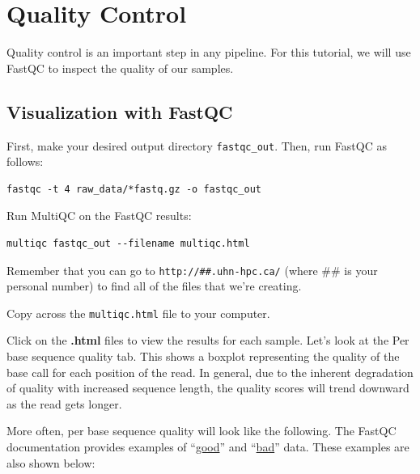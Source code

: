 \documentclass[
]{book}
\begin{document}
\section{Quality Control}\label{quality-control}

Quality control is an important step in any pipeline. For this tutorial, we will use FastQC to inspect the quality of our samples.

\subsection{Visualization with FastQC}\label{visualization-with-fastqc}

First, make your desired output directory \texttt{fastqc\_out}. Then, run FastQC as follows:

\begin{verbatim}
fastqc -t 4 raw_data/*fastq.gz -o fastqc_out
\end{verbatim}

Run MultiQC on the FastQC results:

\begin{verbatim}
multiqc fastqc_out --filename multiqc.html
\end{verbatim}

Remember that you can go to \texttt{http://\#\#.uhn-hpc.ca/} (where \#\# is your personal number) to find all of the files that we're creating.

Copy across the \texttt{multiqc.html} file to your computer.

Click on the \textbf{.html} files to view the results for each sample. Let's look at the Per base sequence quality tab. This shows a boxplot representing the quality of the base call for each position of the read. In general, due to the inherent degradation of quality with increased sequence length, the quality scores will trend downward as the read gets longer.

More often, per base sequence quality will look like the following. The FastQC documentation provides examples of ``\href{https://www.bioinformatics.babraham.ac.uk/projects/fastqc/good_sequence_short_fastqc.html\#M1}{good}'' and ``\href{https://www.bioinformatics.babraham.ac.uk/projects/fastqc/bad_sequence_fastqc.html}{bad}'' data. These examples are also shown below:
\end{document}

